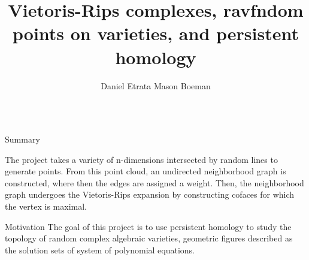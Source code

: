 \documentclass{beamer}
\title{Vietoris-Rips complexes, ravfndom points on varieties, and persistent homology}
\author{Daniel Etrata \quad Mason Boeman}
\institute{Mentors: Benjamin Antieau and J\={a}nis Lazovskis}
\begin{document}
\begin{frame}{}
\begin{columns}[t]

\begin{column}{0.32\linewidth}

\begin{block}{Summary}

The project takes a variety of n-dimensions intersected by random lines to generate points. From this point cloud, an undirected neighborhood graph is constructed, where then the edges are assigned a weight. Then, the neighborhood graph undergoes the Vietoris-Rips expansion by constructing cofaces for which the vertex is maximal.
\end{block}



\begin{block}{Motivation}
The goal of this project is to use persistent homology to study the topology of random complex algebraic varieties, geometric figures described as the solution sets of system of polynomial equations. 

\end{block}


\end{column}
\end{columns}
\end{frame}
\end{document}
